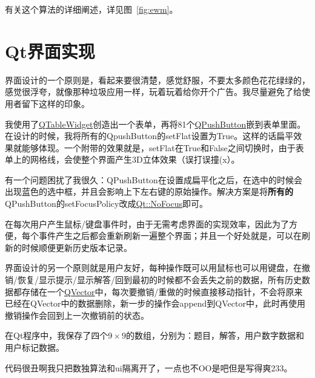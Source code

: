 \documentclass[a4paper]{article}
\begin{document}
有关这个算法的详细阐述，详见图~\ref{fig:ewm}。

\section{Qt界面实现}

界面设计的一个原则是，看起来要很清楚，感觉舒服，不要太多颜色花花绿绿的，感觉很浮夸，就像那种垃圾应用一样，玩着玩着给你开个广告。我尽量避免了给使用者留下这样的印象。

我使用了\uline{QTableWidget}创造出一个表单，再将81个\uline{QPushButton}嵌到表单里面。在设计的时候，我将所有的QpushButton的setFlat设置为True。这样的话扁平效果就能够体现。一个附带的效果就是，setFlat在True和False之间切换时，由于表单上的网格线，会使整个界面产生3D立体效果（误打误撞(x）。

有一个问题困扰了我很久：QPushButton在设置成扁平化之后，在选中的时候会出现蓝色的选中框，并且会影响上下左右键的原始操作。解决方案是将{\bf 所有的}QPushButton的setFocusPolicy改成\uline{Qt::NoFocus}即可。

在每次用户产生鼠标/键盘事件时，由于无需考虑界面的实现效率，因此为了方便，每个事件产生之后都会重新刷新一遍整个界面；并且一个好处就是，可以在刷新的时候顺便更新历史版本记录。

界面设计的另一个原则就是用户友好，每种操作既可以用鼠标也可以用键盘，在撤销/恢复/显示提示/显示解答/回到最初的时候都不会丢失之前的数据，所有历史数据都存储在一个\uline{QVector}中，每次要撤销/重做的时候直接移动指针，不会将原来已经在QVector中的数据删除，新一步的操作会append到QVector中，此时再使用撤销操作会回到上一次撤销前的状态。

在Qt程序中，我保存了四个$9\times 9$的数组，分别为：题目，解答，用户数字数据和用户标记数据。

代码很丑啊我只把数独算法和ui隔离开了，一点也不OO是吧但是写得爽233。
\end{document}
